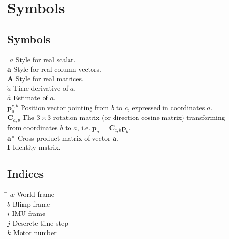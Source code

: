 \chapter*{Symbols}
\label{sec:symbols}

\section*{Symbols}

\begin{tabbing}
 \hspace*{1.6cm} \= \kill
  $a$                     \> Style for real scalar. \\[0.5ex]
  $\mathbf{a}$            \> Style for real column vectors. \\[0.5ex]
  $\mathbf{A}$            \> Style for real matrices. \\[0.5ex]
  $\dot{a}$               \> Time derivative of $a$. \\[0.5ex]
  $\hat{a}$               \> Estimate of $a$. \\[0.5ex]
  $\mathbf{p}^{c,b}_a$    \> Position vector pointing from $b$ to $c$, expressed in coordinates $a$. \\[0.5ex]
  $\mathbf{C}_{a,b}$      \> The $3\times3$ rotation matrix (or direction cosine matrix) transforming \\
                          \> from coordinates $b$ to $a$, i.e. 
                          $\mathbf{p}_a=\mathbf{C}_{a,b}\mathbf{p}_b$. \\ [0.5ex]
  $\mathbf{a}^\times$     \> Cross product matrix of vector $\mathbf{a}$.\\ [0.5ex]
  $\mathbf{I}$            \> Identity matrix.\\ [0.5ex]

\end{tabbing}

\section*{Indices}

\begin{tabbing}
 \hspace*{1.6cm}  \= \kill
 $w$ \> World frame \\[0.5ex]
 $b$ \> Blimp frame \\[0.5ex]
 $i$ \> IMU frame \\[0.5ex]
 $j$ \> Descrete time step \\[0.5ex]
 $k$ \> Motor number \\[0.5ex]
\end{tabbing}

